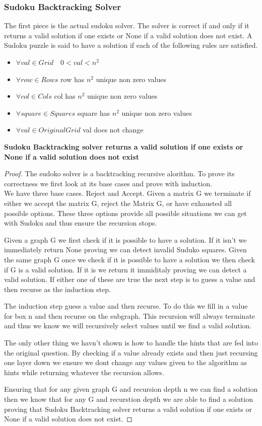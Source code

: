\documentclass{sig-alternate}
\begin{document}
\subsubsection{Sudoku Backtracking Solver}
The first piece is the actual sudoku solver. The solver is correct if and only if it returns a valid solution if one exists or None if a valid solution does not exist. A Sudoku puzzle is said to have a solution if each of the following rules are satisfied. 
\begin{itemize}
\item{$\forall val \in Grid \quad 0 < val < n^2$} 
\item{$\forall row \in Rows$ row has $n^2$ unique non zero values}
\item{$\forall col \in Cols$ col has $n^2$ unique non zero values}
\item{$\forall square \in Squares$ square has $n^2$ unique non zero values}
\item{$\forall val \in Original Grid$ val does not change}
\end{itemize}
\textbf{Sudoku Backtracking solver returns a valid solution if one exists or None if a valid solution does not exist}
\begin{proof}
The sudoko solver is a backtracking recursive alorithm. To prove its correctness we first look at its base cases and prove with induction. \\ 

We have three base cases. Reject and Accept. Given a matrix G we terminate if either we accept the matrix G, reject the Matrix G, or have exhausted all possible options. These three options provide all possible situations we can get with Sudoku and thus ensure the recursion stops.

Given a graph G we first check if it is possible to have a solution. If it isn't we immediately return None proving we can detect invalid Suduko squares. Given the same graph G once we check if it is possible to have a solution we then check if G is a valid solution. If it is we return it immiditaly proving we can detect a valid solution. If either one of these are true the next step is to guess a value and then recurse as the induction step.

The induction step guess a value and then recurse. To do this we fill in a value for box n and then recurse on the subgraph. This recursion will always terminate and thus we know we will recursively select values until we find a valid solution. 

The only other thing we havn't shown is how to handle the hints that are fed into the original question. By checking if a value already exists and then just recursing one layer down we ensure we dont change any values given to the algorithm as hints while returning whatever the recursion allows. 

Ensuring that for any given graph G and recursion depth n we can find a solution then we know that for any G and recurstion depth we are able to find a solution proving that Sudoku Backtracking solver returns a valid solution if one exists or None if a valid solution does not exist.
\end{proof}
\end{document}

